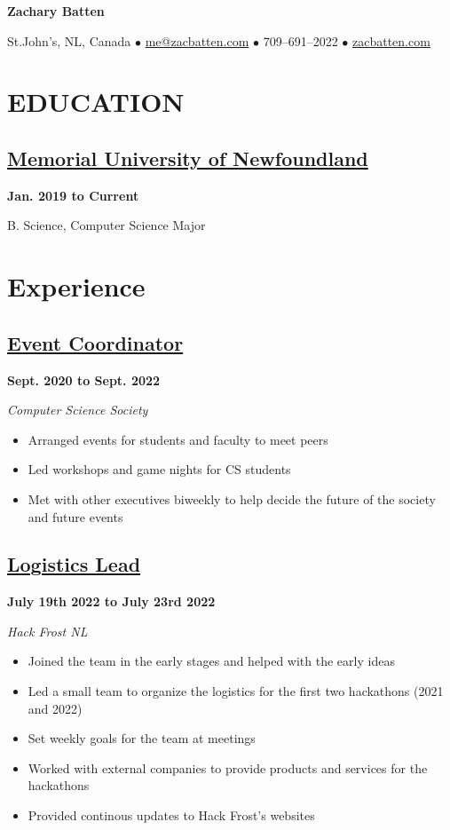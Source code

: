 \documentclass[12pt]{extarticle}
\begin{document}
\begin{center}
\textbf{\huge{Zachary Batten}}

St.John's, NL, Canada
$\bullet$ \href{mailto:me@zacbatten.com}{me@zacbatten.com}
$\bullet$ 709--691--2022
$\bullet$ \href{https://zacbatten.com}{zacbatten.com}
\end{center}

\section*{EDUCATION}
\subsection*{\href{https://www.mun.ca/}{Memorial University of Newfoundland} 
}
\hfill \textbf{Jan. 2019 to Current}

B. Science, Computer Science Major

\section*{Experience}

\subsection*{\href{https://muncompsci.ca/}{Event Coordinator} 
}
\hfill \textbf{Sept. 2020 to Sept. 2022}

\textit{Computer Science Society}
\begin{itemize}
  \item Arranged events for students and faculty to meet peers
  \item Led workshops and game nights for CS students
  \item Met with other executives biweekly to help decide the future of the society and future events
\end{itemize}

\subsection*{\href{https://hackfrostnl.ca/}{Logistics Lead}
} \hfill \textbf{July 19th 2022 to July 23rd 2022}

\textsl{Hack Frost NL}
\begin{itemize}
  \item Joined the team in the early stages and helped with the early ideas
  \item Led a small team to organize the logistics for the first two hackathons (2021 and 2022)
  \item Set weekly goals for the team at meetings
  \item Worked with external companies to provide products and services for the hackathons
  \item Provided continous updates to Hack Frost's websites
\end{itemize}
\end{document}
